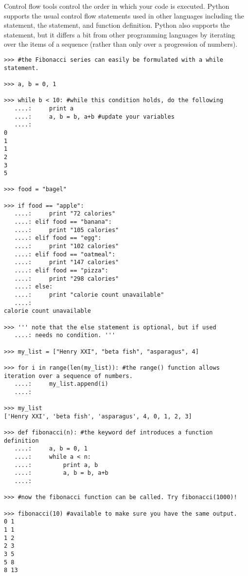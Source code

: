 \begin{example}
Control flow tools control the order in which your code is executed.
Python supports the usual control flow statements used in other languages
including the  statement, the  statement, and function definition. 
Python also supports the  statement, but it differs a bit from other programming languages by iterating over the items of a sequence (rather than only over a progression of numbers).

\begin{lstlisting}
>>> #the Fibonacci series can easily be formulated with a while statement.

>>> a, b = 0, 1

>>> while b < 10: #while this condition holds, do the following
   ....:     print a
   ....:     a, b = b, a+b #update your variables
   ....:     
0
1
1
2
3
5

>>> food = "bagel"

>>> if food == "apple":
   ....:     print "72 calories"
   ....: elif food == "banana":
   ....:     print "105 calories"
   ....: elif food == "egg":
   ....:     print "102 calories"
   ....: elif food == "oatmeal":
   ....:     print "147 calories"
   ....: elif food == "pizza":
   ....:     print "298 calories"
   ....: else: 
   ....:     print "calorie count unavailable"
   ....:     
calorie count unavailable

>>> ''' note that the else statement is optional, but if used
   ....: needs no condition. '''
   
>>> my_list = ["Henry XXI", "beta fish", "asparagus", 4]

>>> for i in range(len(my_list)): #the range() function allows iteration over a sequence of numbers. 
   ....:     my_list.append(i)
   ....:     

>>> my_list
['Henry XXI', 'beta fish', 'asparagus', 4, 0, 1, 2, 3]

>>> def fibonacci(n): #the keyword def introduces a function definition
   ....:     a, b = 0, 1
   ....:     while a < n:
   ....:         print a, b
   ....:         a, b = b, a+b
   ....:         

>>> #now the fibonacci function can be called. Try fibonacci(1000)!

>>> fibonacci(10) #available to make sure you have the same output.
0 1
1 1
1 2
2 3
3 5
5 8
8 13

\end{lstlisting}
\end{example}

